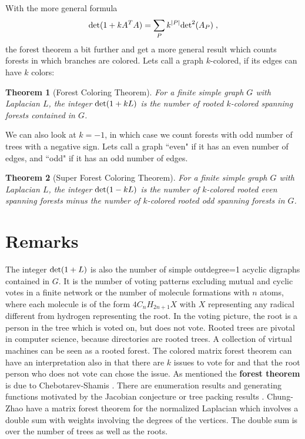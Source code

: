 \documentclass[12pt]{amsart}
\newtheorem{thm}{Theorem}
\theoremstyle{definition}
\begin{document}
With the more general formula
\begin{equation}
 {{\rm det}}(1+k A^T A) = \sum_P k^{|P|} {{\rm det}}^2(A_P)  \; ,
\label{4} 
\end{equation}
the forest theorem a bit further and get a more general result which counts 
forests in which branches are colored. Lets call a graph $k$-colored, if its
edges can have $k$ colors: 

\begin{thm}[Forest Coloring Theorem]
For a finite simple graph $G$ with Laplacian $L$, the integer ${{\rm det}}(1+kL)$ is the number
of rooted $k$-colored spanning forests contained in $G$.
\end{thm}

We can also look at $k=-1$, in which case we count forests with odd number of trees
with a negative sign. 
Lets call a graph ``even" if it has an even number of edges,
and ``odd" if it has an odd number of edges. 

\begin{thm}[Super Forest Coloring Theorem]
For a finite simple graph $G$ with Laplacian $L$, the integer
${{\rm det}}(1-kL)$ is the number of $k$-colored rooted even spanning forests 
minus the number of $k$-colored rooted odd spanning forests in $G$.
\end{thm}

\section{Remarks}

The integer ${{\rm det}}(1+L)$ is also the number of simple outdegree=1 acyclic digraphs contained in $G$. 
It is the number of voting patterns excluding mutual and cyclic votes in a finite network
or the number of molecule formations with $n$ atoms, where each molecule is of the
form $4C_n H_{2n+1} X$ with $X$ representing any radical different from hydrogen \cite{Otter}
representing the root. In the voting picture, the root is a person in the tree which is voted on, 
but does not vote. Rooted trees are pivotal in computer science, because directories are
rooted trees. A collection of virtual machines can be seen as a rooted forest.
The colored matrix forest theorem can have an interpretation also in that there are $k$
issues to vote for and that the root person who does not vote can chose the issue. 
As mentioned the {\bf forest theorem} is due to Chebotarev-Shamis 
\cite{ChebotarevShamis2,ChebotarevShamis1}.
There are enumeration results \cite{ErdoesForests}
and generating functions \cite{Lampe} motivated by the Jacobian conjecture or
tree packing results \cite{Katoh}. 
Chung-Zhao \cite{ChungZhao} have a matrix forest theorem for the normalized Laplacian which
involves a double sum with weights involving the degrees of the vertices.
The double sum is over the number of trees as well as the roots.  \\
\end{document}
